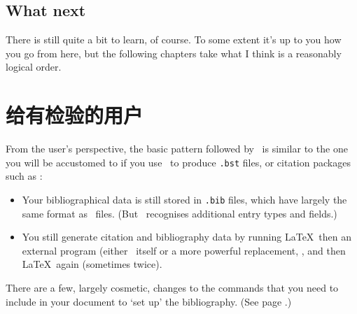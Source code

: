 \subsection{What next}

There is still quite a bit to learn, of course. To some extent it's up
to you how you go from here, but the following chapters take what I
think is a reasonably logical order.

\section{给有检验的用户}
\label{expert}

From the user's perspective, the basic pattern followed by \biblatex\
is similar to the one you will be accustomed to if you use \bibtex\
to produce \verb|.bst| files, or citation packages such as :
\begin{itemize}
\item Your bibliographical data is still stored in \verb|.bib| files,
  which have largely the same format as \bibtex\ files. (But
  \biblatex\ recognises additional entry types and fields.)
\item You still generate citation and bibliography data by running
  \LaTeX\, then an external program (either \bibtex\ itself or a more
  powerful replacement, \package{Biber}, and then \LaTeX\ again
  (sometimes twice).
\end{itemize}

There are a few, largely cosmetic, changes to the commands that you
need to include in your document to `set up' the bibliography. (See
page \pageref{bibtex:simple:eg}.)

